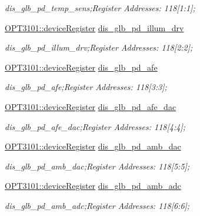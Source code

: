 \begin{DoxyCompactItemize}
\begin{DoxyCompactList}\small\item\em dis\+\_\+glb\+\_\+pd\+\_\+temp\+\_\+sens;Register Addresses\+: 118\mbox{[}1\+:1\mbox{]}; \end{DoxyCompactList}\item 
\mbox{\hyperlink{class_o_p_t3101_1_1device_register}{O\+P\+T3101\+::device\+Register}} \mbox{\hyperlink{class_o_p_t3101_1_1registers_a9557e8aacd96cbfd2421ed895d56abb3}{dis\+\_\+glb\+\_\+pd\+\_\+illum\+\_\+drv}}
\begin{DoxyCompactList}\small\item\em dis\+\_\+glb\+\_\+pd\+\_\+illum\+\_\+drv;Register Addresses\+: 118\mbox{[}2\+:2\mbox{]}; \end{DoxyCompactList}\item 
\mbox{\hyperlink{class_o_p_t3101_1_1device_register}{O\+P\+T3101\+::device\+Register}} \mbox{\hyperlink{class_o_p_t3101_1_1registers_abb5ba013372994b83ebb79f3a71eaaa4}{dis\+\_\+glb\+\_\+pd\+\_\+afe}}
\begin{DoxyCompactList}\small\item\em dis\+\_\+glb\+\_\+pd\+\_\+afe;Register Addresses\+: 118\mbox{[}3\+:3\mbox{]}; \end{DoxyCompactList}\item 
\mbox{\hyperlink{class_o_p_t3101_1_1device_register}{O\+P\+T3101\+::device\+Register}} \mbox{\hyperlink{class_o_p_t3101_1_1registers_a0ee2968d370dd91f801c426a63d1bd0d}{dis\+\_\+glb\+\_\+pd\+\_\+afe\+\_\+dac}}
\begin{DoxyCompactList}\small\item\em dis\+\_\+glb\+\_\+pd\+\_\+afe\+\_\+dac;Register Addresses\+: 118\mbox{[}4\+:4\mbox{]}; \end{DoxyCompactList}\item 
\mbox{\hyperlink{class_o_p_t3101_1_1device_register}{O\+P\+T3101\+::device\+Register}} \mbox{\hyperlink{class_o_p_t3101_1_1registers_a84c0c760189050ec68794f4b1e44e45f}{dis\+\_\+glb\+\_\+pd\+\_\+amb\+\_\+dac}}
\begin{DoxyCompactList}\small\item\em dis\+\_\+glb\+\_\+pd\+\_\+amb\+\_\+dac;Register Addresses\+: 118\mbox{[}5\+:5\mbox{]}; \end{DoxyCompactList}\item 
\mbox{\hyperlink{class_o_p_t3101_1_1device_register}{O\+P\+T3101\+::device\+Register}} \mbox{\hyperlink{class_o_p_t3101_1_1registers_a1ac58d06b3afba34d8901fc8c36a80df}{dis\+\_\+glb\+\_\+pd\+\_\+amb\+\_\+adc}}
\begin{DoxyCompactList}\small\item\em dis\+\_\+glb\+\_\+pd\+\_\+amb\+\_\+adc;Register Addresses\+: 118\mbox{[}6\+:6\mbox{]}; \end{DoxyCompactList}\item 

\end{DoxyCompactItemize}
